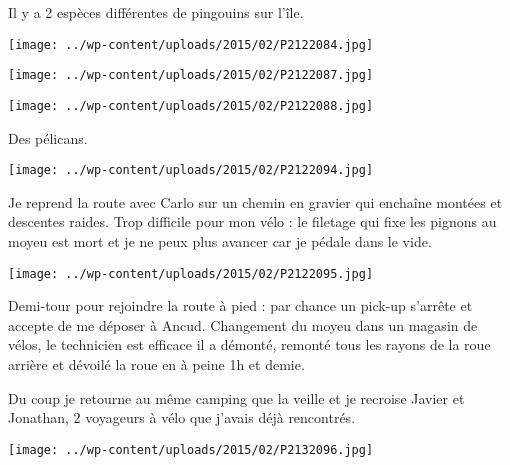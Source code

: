 \pagebreak
 Il y a 2 espèces différentes de pingouins sur l'île. 
\begin{center} \texttt{[image: ../wp-content/uploads/2015/02/P2122084.jpg]} \end{center}
\begin{center} \texttt{[image: ../wp-content/uploads/2015/02/P2122087.jpg]} \end{center}
\vspace{-\topsep}
\vspace{-3.25mm}

\pagebreak
\begin{center} \texttt{[image: ../wp-content/uploads/2015/02/P2122088.jpg]} \end{center}

 Des pélicans.
\begin{center} \texttt{[image: ../wp-content/uploads/2015/02/P2122094.jpg]} \end{center}

 Je reprend la route avec Carlo sur un chemin en gravier qui enchaîne montées et descentes raides. 
 Trop difficile pour mon vélo : le filetage qui fixe les pignons au moyeu est mort et je ne peux plus avancer car je pédale dans le vide.
\begin{center} \texttt{[image: ../wp-content/uploads/2015/02/P2122095.jpg]} \end{center}

\vfill
 Demi-tour pour rejoindre la route à pied : par chance un pick-up s'arrête et accepte de me déposer à Ancud.
 Changement du moyeu dans un magasin de vélos, le technicien est efficace il a démonté, remonté tous les rayons de la roue arrière et dévoilé la roue en à peine 1h et demie.

\vfill
 Du coup je retourne au même camping que la veille et je recroise Javier et Jonathan, 2 voyageurs à vélo que j'avais déjà rencontrés.
\vfill
\begin{center} \texttt{[image: ../wp-content/uploads/2015/02/P2132096.jpg]} \end{center}
\vspace{-\topsep}
\vspace{-0.75mm}
